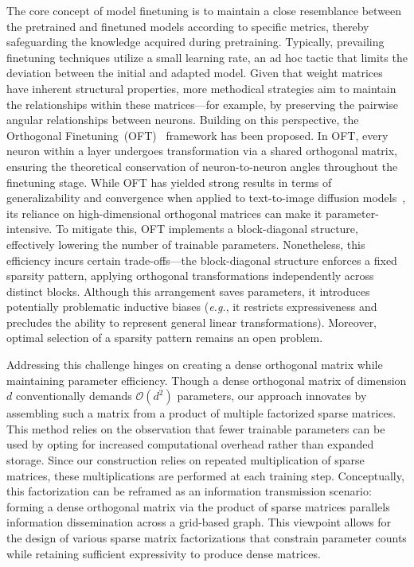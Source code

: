 The core concept of model finetuning is to maintain a close resemblance between the pretrained and finetuned models according to specific metrics, thereby safeguarding the knowledge acquired during pretraining. Typically, prevailing finetuning techniques utilize a small learning rate, an ad hoc tactic that limits the deviation between the initial and adapted model. Given that weight matrices have inherent structural properties, more methodical strategies aim to maintain the relationships within these matrices—for example, by preserving the pairwise angular relationships between neurons. Building on this perspective, the Orthogonal Finetuning~(OFT)~\cite{qiu2023controlling} framework has been proposed. In OFT, every neuron within a layer undergoes transformation via a shared orthogonal matrix, ensuring the theoretical conservation of neuron-to-neuron angles throughout the finetuning stage. While OFT has yielded strong results in terms of generalizability and convergence when applied to text-to-image diffusion models~\cite{qiu2023controlling}, its reliance on high-dimensional orthogonal matrices can make it parameter-intensive. To mitigate this, OFT implements a block-diagonal structure, effectively lowering the number of trainable parameters. Nonetheless, this efficiency incurs certain trade-offs—the block-diagonal structure enforces a fixed sparsity pattern, applying orthogonal transformations independently across distinct blocks. Although this arrangement saves parameters, it introduces potentially problematic inductive biases (\emph{e.g.}, it restricts expressiveness and precludes the ability to represent general linear transformations). Moreover, optimal selection of a sparsity pattern remains an open problem.

Addressing this challenge hinges on creating a dense orthogonal matrix while maintaining parameter efficiency. Though a dense orthogonal matrix of dimension $d$ conventionally demands $\mathcal{O}(d^2)$ parameters, our approach innovates by assembling such a matrix from a product of multiple factorized sparse matrices. This method relies on the observation that fewer trainable parameters can be used by opting for increased computational overhead rather than expanded storage. Since our construction relies on repeated multiplication of sparse matrices, these multiplications are performed at each training step. Conceptually, this factorization can be reframed as an information transmission scenario: forming a dense orthogonal matrix via the product of sparse matrices parallels information dissemination across a grid-based graph. This viewpoint allows for the design of various sparse matrix factorizations that constrain parameter counts while retaining sufficient expressivity to produce dense matrices.

